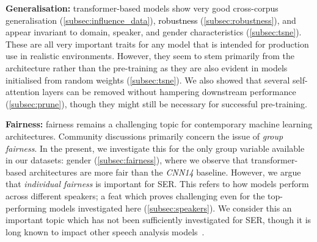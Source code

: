 \documentclass{article}
\newcommand\cnn{\mbox{\emph{CNN14}}}
\newcommand{\review}[1]{\textcolor{black}{#1}}
\begin{document}
\textbf{Generalisation:}
transformer-based models show very good cross-corpus generalisation (\cref{subsec:influence_data}),
\review{robustness} (\cref{subsec:robustness}),
and appear invariant to domain, speaker, and gender characteristics (\cref{subsec:tsne}).
These are all very important traits for any model
that is intended for production use in realistic environments.
However, they seem to stem primarily from the architecture
rather than the pre-training
as they are also evident in models initialised from random weights (\cref{subsec:tsne}).
We also showed that several self-attention layers can be removed
without hampering downstream performance (\cref{subsec:prune}),
though they might still be necessary for successful pre-training.

\textbf{Fairness:}
fairness remains a challenging topic for contemporary machine learning architectures.
Community discussions primarily concern the issue of \emph{group fairness}.
In the present, we investigate this for the only group variable available in our datasets:
gender (\cref{subsec:fairness}),
where we observe that transformer-based architectures are more fair than the {\cnn} baseline.
However, we argue that \emph{individual fairness} is important for \ac{SER}.
This refers to how models perform across different speakers;
a feat which proves challenging even for the top-performing models investigated here (\cref{subsec:speakers}).
We consider this an important topic which has not been sufficiently investigated for \ac{SER},
though it is long known to impact other speech analysis models~\citep{doddington1998sheep,rajan2021fairness}.
\end{document}
